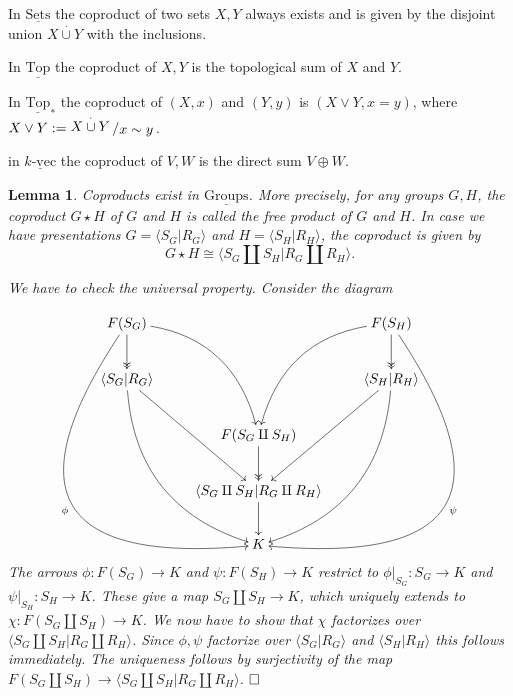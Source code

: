 \documentclass[11pt]{book}
\numberwithin{dummy}{section}
\newtheorem{lemma}[theorem]{Lemma}
\theoremstyle{nonumberbreak}
\newenvironment{pr}[1][]{\ifthenelse{\equal{#1}{}}{\proof}{\proof[#1]}\rm}{\endproof}
\newenvironment{ex}[1][]{\ifthenelse{\equal{#1}{}}{\example}{\example[#1]}\rm}{\endexample}
\newcommand{\sets}{\underline{\mathrm{Sets}}}
\newcommand{\kvec}{\underline{k\textrm{-}\mathrm{vec}}}
\newcommand{\grp}{\underline{\mathrm{Groups}}}
\newcommand{\topsp}{\underline{\mathrm{Top}}}
\newcommand{\topstar}{\underline{\mathrm{Top}}_*}
\newcommand{\la}{\longrightarrow}
\newcommand{\slant}[2]{{\raisebox{.1em}{$#1$}\left/\raisebox{-.1em}{$#2$}\right.}}
\begin{document}
\begin{spacing}{1.4}
\begin{ex}
\end{ex}


\begin{ex}
\begin{compactenum}
\item In $\sets$ the coproduct of two sets $X,Y$ always exists and is given by the disjoint union $X \overset{\cdot}{\cup} Y$ with the inclusions.
\item In $\topsp$ the coproduct of $X,Y$ is the topological sum of $X$ and $Y$.
\item In $\topstar$ the coproduct of $(X,x)$ and $(Y,y)$ is $(X \vee Y, x=y)$, where $X \vee Y:= \slant{X \overset{\cdot}{\cup} Y}{x \sim y}$.
\item in $\kvec$ the coproduct of $V,W$ is the direct sum $V \oplus W$.

\end{compactenum}
\end{ex}

\begin{lemma}
Coproducts exist in $\grp$. More precisely, for any groups $G,H$, the coproduct $G \star H$ of $G$ and $H$ is called the \textit{free product of} $G$ and $H$. In case we have presentations $G= \langle S_G \vert R_G \rangle$ and $H = \langle S_H \vert R_H\rangle$, the coproduct is given by
$$G\star H \cong \langle S_G \amalg S_H \vert R_G \amalg R_H \rangle.$$

\begin{pr}
We have to check the universal property. Consider the diagram

$$
\begin{xy}
\xymatrix{
F(S_G) \ar@/_{100pt}/[rdddd]_{\phi} \ar@/^{24pt}/[rdd] \ar@{->>}[d] && F(S_H) \ar@/^{100pt}/[ldddd]^{\psi} \ar@/_{24pt}/[ldd] \ar@{->>}[d] \\
\langle S_G \vert R_G\rangle \ar@/_{28pt}/[rddd] \ar[rdd] && \langle S_H \vert R_H \ar@/^{28pt}/[lddd] \rangle \ar[ldd] \\
& F(S_G \amalg S_H) \ar@{->>}[d] & \\
& \langle S_G \amalg S_H \vert R_G \amalg R_H \rangle \ar[d] & \\
& K & 
}
\end{xy}
$$
The arrows $\phi: F(S_G) \la K$ and $\psi: F(S_H) \la K$ restrict to $\phi\vert_{S_G}: S_G \la K$ and $\psi\vert_{S_H}: S_H \la K$. These give a map $S_G \amalg S_H \la K$, which uniquely extends to $\chi: F(S_G \amalg S_H) \la K$. We now have to show that $\chi$ factorizes over $\langle S_G \amalg S_H \vert R_G \amalg R_H \rangle$. Since $\phi, \psi$ factorize over $\langle S_G \vert R_G\rangle$ and $\langle S_H \vert R_H \rangle$ this follows immediately. The uniqueness follows by surjectivity of the map $F(S_G \amalg S_H) \la \langle S_G \amalg S_H \vert R_G \amalg R_H \rangle$. $\hfill \Box$


\end{pr}
\end{lemma}
\end{spacing}
\end{document}
